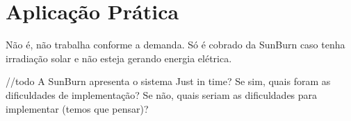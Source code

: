 \section{Aplicação Prática}
\label{sec:fonercimento_just_in_time_aplicacao}
Não é, não trabalha conforme a demanda. Só é cobrado da SunBurn caso tenha irradiação solar e não esteja gerando energia elétrica.

//todo A SunBurn apresenta o sistema Just in time? Se sim, quais foram as dificuldades de implementação? Se não, quais seriam as dificuldades para implementar (temos que pensar)? 